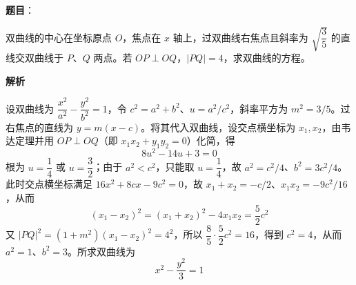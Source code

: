 \begin{answer}

\textbf{题目}：

双曲线的中心在坐标原点 $O$，焦点在 $x$ 轴上，过双曲线右焦点且斜率为 $\sqrt{\dfrac35}$ 的直线交双曲线于 $P$、$Q$ 两点。若 $OP\perp OQ$，$|PQ|=4$，求双曲线的方程。

\textbf{解析}

设双曲线为 $\dfrac{x^2}{a^2}-\dfrac{y^2}{b^2}=1$，令 $c^2=a^2+b^2$、$u=a^2/c^2$，斜率平方为 $m^2=3/5$。过右焦点的直线为 $y=m(x-c)$。将其代入双曲线，设交点横坐标为 $x_1,x_2$，由韦达定理并用 $OP\perp OQ$（即 $x_1x_2+y_1y_2=0$）化简，得
\nopagebreak[4]
\[
8u^2-14u+3=0
\]
根为 $u=\dfrac14$ 或 $u=\dfrac32$；由于 $a^2<c^2$，只能取 $u=\dfrac14$，故 $a^2=c^2/4$、$b^2=3c^2/4$。此时交点横坐标满足 $16x^2+8cx-9c^2=0$，故 $x_1+x_2=-c/2$、$x_1x_2=-9c^2/16$，从而
\nopagebreak[4]
\[
(x_1-x_2)^2=(x_1+x_2)^2-4x_1x_2=\frac52c^2
\]
又 $|PQ|^2=(1+m^2)(x_1-x_2)^2=4^2$，所以 $\dfrac85\cdot\dfrac52c^2=16$，得到 $c^2=4$，从而 $a^2=1$、$b^2=3$。所求双曲线为
\nopagebreak[4]
\[
x^2-\frac{y^2}{3}=1
\]


\end{answer}